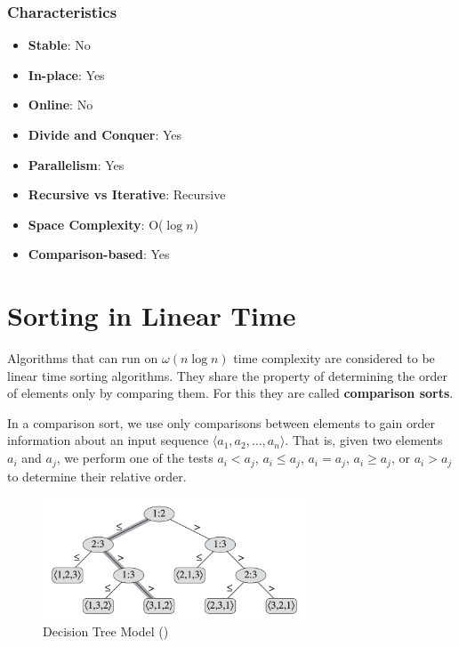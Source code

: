 \subsubsection*{Characteristics}

\begin{itemize}
    \item \textbf{Stable}: No
    \item \textbf{In-place}: Yes
    \item \textbf{Online}: No
    \item \textbf{Divide and Conquer}: Yes
    \item \textbf{Parallelism}: Yes
    \item \textbf{Recursive vs Iterative}: Recursive
    \item \textbf{Space Complexity}: O($\log n$)
    \item \textbf{Comparison-based}: Yes
\end{itemize}






\section{Sorting in Linear Time}

Algorithms that can run on $\omega(n \log n)$ time complexity are considered to be linear time sorting algorithms. They share the property of determining the order of elements only by comparing them. For this they are called \textbf{comparison sorts}.

In a comparison sort, we use only comparisons between elements to gain order 
information about an input sequence $\langle a_1, a_2, \dots, a_n \rangle$. That is, given two elements 
$a_i$ and $a_j$, we perform one of the tests $a_i < a_j$, $a_i \leq a_j$, $a_i = a_j$, 
$a_i \geq a_j$, or $a_i > a_j$ to determine their relative order.

\begin{figure}[H]
    \centering
    \includegraphics[width=0.7\textwidth]{assets/tree_model.png}
    \caption{Decision Tree Model (\cite{cormen2022introduction})}
\end{figure}

